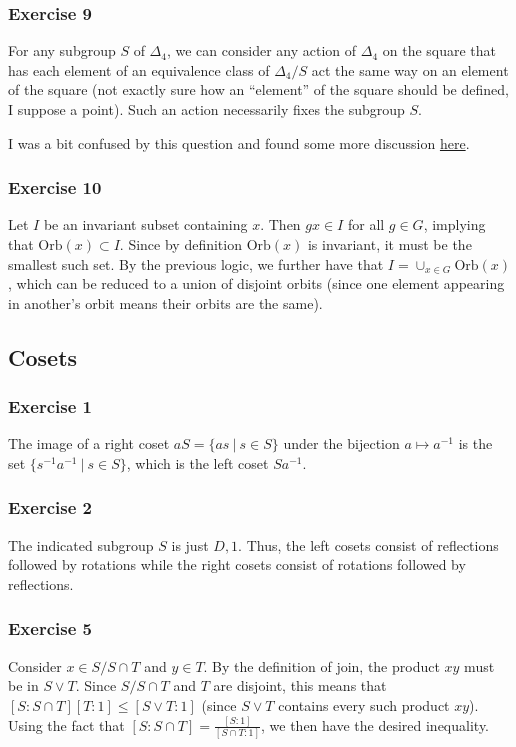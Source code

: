 \subsubsection{Exercise 9}
For any subgroup $S$ of $\Delta_4$, we can consider any action of $\Delta_4$ on the square that has each
element of an equivalence class of $\Delta_4 / S$ act the same way on an element of the square (not exactly
sure how an ``element'' of the square should be defined, I suppose a point). Such an action necessarily
fixes the subgroup $S$.

I was a bit confused by this question and found some more discussion \href{https://math.stackexchange.com/questions/76255/show-every-subgroup-of-d4-can-be-regarded-as-an-isotropy-group-for-a-suitable-ac}{here}.

\subsubsection{Exercise 10}
Let $I$ be an invariant subset containing $x$. Then $gx \in I$ for all $g \in G$, implying that 
$\text{Orb}(x) \subset I$. Since by definition  $\text{Orb}(x)$ is invariant, it must be the smallest such
set. By the previous logic, we further have that $I = \cup_{x \in G} \text{Orb}(x)$, which can be reduced
to a union of disjoint orbits (since one element appearing in another's orbit means their orbits are the same).

\subsection{Cosets}

\subsubsection{Exercise 1}
The image of a right coset $aS = \{ as \: | \: s \in S \}$ under the bijection $a \mapsto a^{-1}$ is the set 
$\{ s^{-1} a^{-1} \: | \: s \in S\}$, which is the left coset $Sa^{-1}$.

\subsubsection{Exercise 2}
The indicated subgroup $S$ is just ${D, 1}$. Thus, the left cosets consist of reflections followed by rotations
while the right cosets consist of rotations followed by reflections.

\subsubsection{Exercise 5}
Consider $x \in S / S \cap T$ and $y \in T$. By the definition of join, the product $xy$ must be in $S \vee T$.
Since $S / S \cap T$ and $T$ are disjoint, this means that $[S : S \cap T] [T : 1] \leq [S \vee T : 1]$ (since
$S \vee T$ contains every such product $xy$). Using the fact that  $[S : S \cap T] = \frac{[S : 1]}{[S \cap T : 1]}$, we then have the desired inequality.

